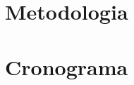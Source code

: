 \documentclass[a4paper,11pt]{article}
\begin{document}
\section{Metodologia}

\section{Cronograma}



\end{document}
